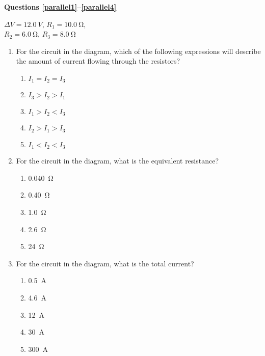 \documentclass{../../../oss-classkick}
\begin{document}
\begin{multicols*}{2}
  \textbf{Questions \ref{parallel1}--\ref{parallel4}}
  \begin{center}
    
    \vspace{.1in}$\Delta V=\SI{12.0}{V}$, $R_1=\SI{10.0}{\ohm}$,\\
    $R_2=\SI{6.0}{\ohm}$, $R_3=\SI{8.0}{\ohm}$
  \end{center}

  \begin{enumerate}[leftmargin=18pt,resume]
  \item For the circuit in the diagram, which of the following expressions will
    describe the amount of current flowing through the resistors?
    \begin{enumerate}[nosep,leftmargin=18pt,label=(\Alph*)]
    \item $I_1=I_2=I_3$
    \item $I_3>I_2>I_1$
    \item $I_1>I_2<I_3$
    \item $I_2>I_1>I_3$
    \item $I_1<I_2<I_3$
    \end{enumerate}
    \label{parallel1}
    
  \item For the circuit in the diagram, what is the equivalent resistance?
    \begin{enumerate}[nosep,leftmargin=18pt,label=(\Alph*)]
      \item\SI{0.040}{\ohm}
      \item\SI{0.40}{\ohm}
      \item\SI{1.0}{\ohm}
      \item\SI{2.6}{\ohm}
      \item\SI{24}{\ohm}
    \end{enumerate}
    
  \item For the circuit in the diagram, what is the total current?
    \begin{enumerate}[nosep,leftmargin=18pt,label=(\Alph*)]
    \item\SI{0.5}{\ampere}
    \item\SI{4.6}{\ampere}
    \item\SI{12}{\ampere}
    \item\SI{30}{\ampere}
    \item\SI{300}{\ampere}
    \end{enumerate}
    

\end{enumerate}
\end{multicols*}
\end{document}
